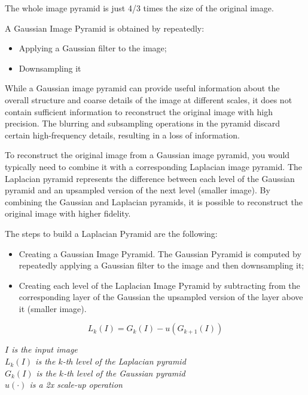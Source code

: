 \documentclass{article}
\begin{document}
The whole image pyramid is just 4/3 times the size of the original image.

A Gaussian Image Pyramid is obtained by repeatedly:
\begin{itemize}
    \item Applying a Gaussian filter to the image;
    \item Downsampling it
\end{itemize}

While a Gaussian image pyramid can provide useful information about the overall structure and coarse details of the image at different scales, it does not contain sufficient information to reconstruct the original image with high precision. The blurring and subsampling operations in the pyramid discard certain high-frequency details, resulting in a loss of information.

To reconstruct the original image from a Gaussian image pyramid, you would typically need to combine it with a corresponding Laplacian image pyramid. The Laplacian pyramid represents the difference between each level of the Gaussian pyramid and an upsampled version of the next level (smaller image). By combining the Gaussian and Laplacian pyramids, it is possible to reconstruct the original image with higher fidelity.

The steps to build a Laplacian Pyramid are the following:

\begin{itemize}
    \item Creating a Gaussian Image Pyramid. The Gaussian Pyramid is computed by repeatedly applying a Gaussian filter to the image and then downsampling it;
    \item Creating each level of the Laplacian Image Pyramid by subtracting from the corresponding layer of the Gaussian the upsampled version of the layer above it (smaller image).
\end{itemize}

\begin{equation*}
    L_k(I) = G_k(I) - u(G_{k+1}(I))
\end{equation*}

\begin{center}
    \textit{$I$ is the input image} \\
    \textit{$L_k(I)$ is the $k$-th level of the Laplacian pyramid} \\
    \textit{$G_k(I)$ is the $k$-th level of the Gaussian pyramid} \\
    \textit{$u(\cdot)$ is a 2x scale-up operation}
\end{center}
\end{document}
